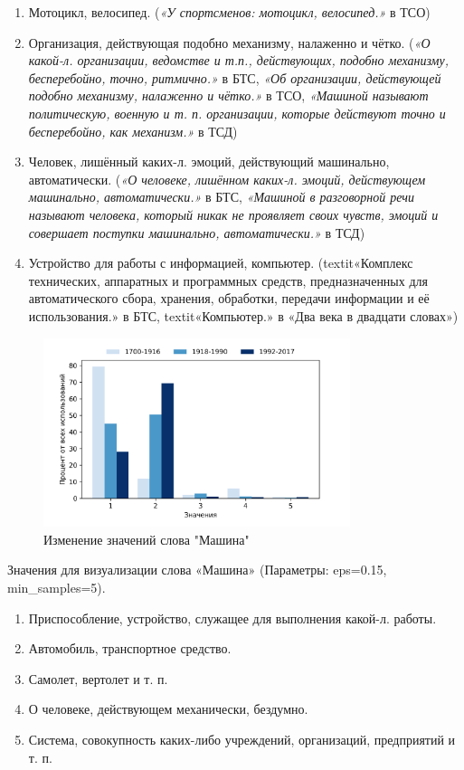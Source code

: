 \begin{enumerate}
    \item Мотоцикл, велосипед.
(\textit{«У спортсменов: мотоцикл, велосипед.»} в ТСО)

    \item Организация, действующая подобно механизму, налаженно и чётко.
(\textit{«О какой-л. организации, ведомстве и т.п., действующих, подобно механизму, бесперебойно, точно, ритмично.»} в БТС,
\textit{«Об организации, действующей подобно механизму, налаженно и чётко.»} в ТСО,
\textit{«Машиной называют политическую, военную и т. п. организации, которые действуют точно и бесперебойно, как механизм.»} в ТСД)

    \item Человек, лишённый каких-л. эмоций, действующий машинально, автоматически.
(\textit{«О человеке, лишённом каких-л. эмоций, действующем машинально, автоматически.»} в БТС,
\textit{«Машиной в разговорной речи называют человека, который никак не проявляет своих чувств, эмоций и совершает поступки машинально, автоматически.»} в ТСД)

    \item Устройство для работы с информацией, компьютер.
(textit{«Комплекс технических, аппаратных и программных средств, предназначенных для автоматического сбора, хранения, обработки, передачи информации и её использования.»} в БТС,
textit{«Компьютер.»} в «Два века в двадцати словах»)
\end{enumerate}

\begin{figure}[H]
	\centering
	\includegraphics[width=0.8\textwidth]{img/visualizations/mashina_minimal}
	\caption{Изменение значений слова "Машина"}
	\label{fig:Машина}
\end{figure}

Значения для визуализации слова «Машина» (Параметры: eps=0.15, min\_samples=5).

\begin{enumerate}
    \item Приспособление, устройство, служащее для выполнения какой-л. работы.
    \item Автомобиль, транспортное средство.
    \item Самолет, вертолет и т. п.
    \item О человеке, действующем механически, бездумно.
    \item Система, совокупность каких-либо учреждений, организаций, предприятий и т. п.
\end{enumerate}

